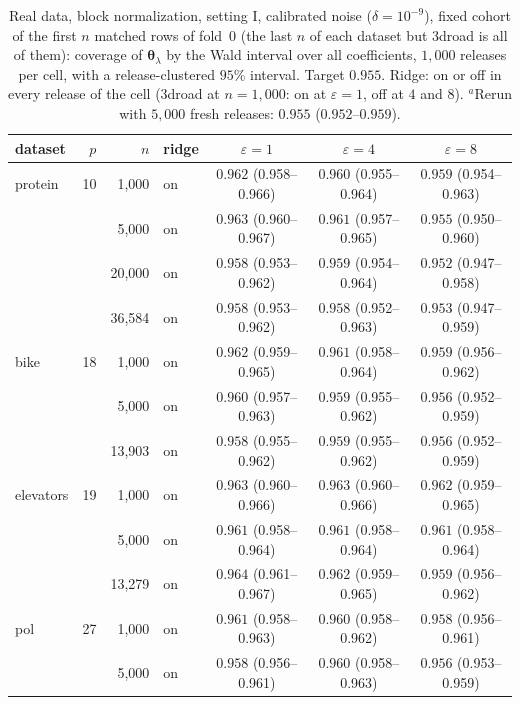 \documentclass[11pt]{article}
\theoremstyle{definition}
\theoremstyle{plain}
\newcommand{\btheta}{\boldsymbol{\theta}}
\begin{document}
\begin{table}[ht]
  \centering\small
  \caption{Real data, block normalization, setting I, calibrated noise ($\delta = 10^{-9}$), fixed cohort of the first $n$ matched rows of fold~0 (the last $n$ of each dataset but 3droad is all of them): coverage of $\btheta_\lambda$ by the Wald interval over all coefficients, $1{,}000$ releases per cell, with a release-clustered $95\%$ interval. Target $0.955$. Ridge: on or off in every release of the cell (3droad at $n = 1{,}000$: on at $\varepsilon = 1$, off at $4$ and $8$). $^{a}$Rerun with $5{,}000$ fresh releases: $0.955$ ($0.952$--$0.959$).}
  \label{tab:coverage_real}
  \footnotesize
  \setlength{\tabcolsep}{4pt}
  \begin{tabular}{@{}lrrlccc@{}}
    \toprule
    dataset & $p$ & $n$ & ridge & $\varepsilon = 1$ & $\varepsilon = 4$ & $\varepsilon = 8$ \\
    \midrule
    protein & 10 & 1{,}000 & on & $0.962$ (0.958--0.966) & $0.960$ (0.955--0.964) & $0.959$ (0.954--0.963) \\
     & & 5{,}000 & on & $0.963$ (0.960--0.967) & $0.961$ (0.957--0.965) & $0.955$ (0.950--0.960) \\
     & & 20{,}000 & on & $0.958$ (0.953--0.962) & $0.959$ (0.954--0.964) & $0.952$ (0.947--0.958) \\
     & & 36{,}584 & on & $0.958$ (0.953--0.962) & $0.958$ (0.952--0.963) & $0.953$ (0.947--0.959) \\
    \addlinespace
    bike & 18 & 1{,}000 & on & $0.962$ (0.959--0.965) & $0.961$ (0.958--0.964) & $0.959$ (0.956--0.962) \\
     & & 5{,}000 & on & $0.960$ (0.957--0.963) & $0.959$ (0.955--0.962) & $0.956$ (0.952--0.959) \\
     & & 13{,}903 & on & $0.958$ (0.955--0.962) & $0.959$ (0.955--0.962) & $0.956$ (0.952--0.959) \\
    \addlinespace
    elevators & 19 & 1{,}000 & on & $0.963$ (0.960--0.966) & $0.963$ (0.960--0.966) & $0.962$ (0.959--0.965) \\
     & & 5{,}000 & on & $0.961$ (0.958--0.964) & $0.961$ (0.958--0.964) & $0.961$ (0.958--0.964) \\
     & & 13{,}279 & on & $0.964$ (0.961--0.967) & $0.962$ (0.959--0.965) & $0.959$ (0.956--0.962) \\
    \addlinespace
    pol & 27 & 1{,}000 & on & $0.961$ (0.958--0.963) & $0.960$ (0.958--0.962) & $0.958$ (0.956--0.961) \\
     & & 5{,}000 & on & $0.958$ (0.956--0.961) & $0.960$ (0.958--0.963) & $0.956$ (0.953--0.959) \\

\end{tabular}
\end{table}
\end{document}
